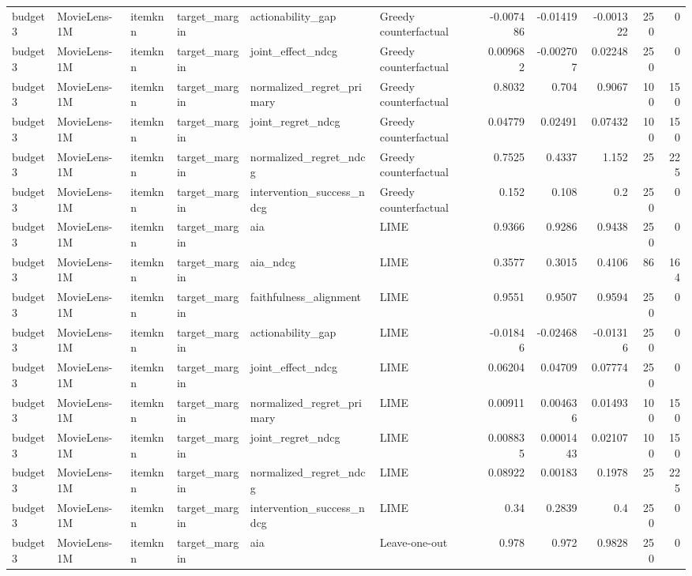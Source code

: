 \begin{table}[t]
{\begin{tabular}{llllllrrrrr}
budget3 & MovieLens-1M & itemknn & target\_margin & actionability\_gap & Greedy counterfactual & -0.007486 & -0.01419 & -0.001322 & 250 & 0 \\
budget3 & MovieLens-1M & itemknn & target\_margin & joint\_effect\_ndcg & Greedy counterfactual & 0.009682 & -0.002707 & 0.02248 & 250 & 0 \\
budget3 & MovieLens-1M & itemknn & target\_margin & normalized\_regret\_primary & Greedy counterfactual & 0.8032 & 0.704 & 0.9067 & 100 & 150 \\
budget3 & MovieLens-1M & itemknn & target\_margin & joint\_regret\_ndcg & Greedy counterfactual & 0.04779 & 0.02491 & 0.07432 & 100 & 150 \\
budget3 & MovieLens-1M & itemknn & target\_margin & normalized\_regret\_ndcg & Greedy counterfactual & 0.7525 & 0.4337 & 1.152 & 25 & 225 \\
budget3 & MovieLens-1M & itemknn & target\_margin & intervention\_success\_ndcg & Greedy counterfactual & 0.152 & 0.108 & 0.2 & 250 & 0 \\
budget3 & MovieLens-1M & itemknn & target\_margin & aia & LIME & 0.9366 & 0.9286 & 0.9438 & 250 & 0 \\
budget3 & MovieLens-1M & itemknn & target\_margin & aia\_ndcg & LIME & 0.3577 & 0.3015 & 0.4106 & 86 & 164 \\
budget3 & MovieLens-1M & itemknn & target\_margin & faithfulness\_alignment & LIME & 0.9551 & 0.9507 & 0.9594 & 250 & 0 \\
budget3 & MovieLens-1M & itemknn & target\_margin & actionability\_gap & LIME & -0.01846 & -0.02468 & -0.01316 & 250 & 0 \\
budget3 & MovieLens-1M & itemknn & target\_margin & joint\_effect\_ndcg & LIME & 0.06204 & 0.04709 & 0.07774 & 250 & 0 \\
budget3 & MovieLens-1M & itemknn & target\_margin & normalized\_regret\_primary & LIME & 0.00911 & 0.004636 & 0.01493 & 100 & 150 \\
budget3 & MovieLens-1M & itemknn & target\_margin & joint\_regret\_ndcg & LIME & 0.008835 & 0.0001443 & 0.02107 & 100 & 150 \\
budget3 & MovieLens-1M & itemknn & target\_margin & normalized\_regret\_ndcg & LIME & 0.08922 & 0.00183 & 0.1978 & 25 & 225 \\
budget3 & MovieLens-1M & itemknn & target\_margin & intervention\_success\_ndcg & LIME & 0.34 & 0.2839 & 0.4 & 250 & 0 \\
budget3 & MovieLens-1M & itemknn & target\_margin & aia & Leave-one-out & 0.978 & 0.972 & 0.9828 & 250 & 0 \\

\end{tabular}}
\end{table}
